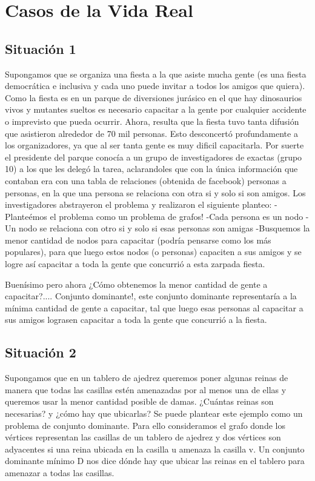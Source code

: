 \section{Casos de la Vida Real}

\subsection{Situación 1}
Supongamos que se organiza una fiesta a la que asiste mucha gente (es una fiesta democrática e inclusiva y cada uno puede invitar a todos los amigos que quiera). Como la fiesta es en un parque de diversiones jurásico en el que hay dinosaurios vivos y mutantes sueltos es necesario capacitar a la gente por cualquier accidente o imprevisto que pueda ocurrir. Ahora, resulta que la fiesta tuvo tanta difusión que asistieron alrededor de 70 mil personas. Esto desconcertó profundamente a los organizadores, ya que al ser tanta gente es muy dificil capacitarla. Por suerte el presidente del parque conocía a un grupo de investigadores de exactas (grupo 10) a los que les delegó la tarea, aclarandoles que con la única información que contaban era con una tabla de relaciones (obtenida de facebook) personas a personas, en la que una persona se relaciona con otra si y solo si son amigos.
Los investigadores abstrayeron el problema y realizaron el siguiente planteo:
-Planteémos el problema como un problema de grafos!
-Cada persona es un nodo
-Un nodo se relaciona con otro si y solo si esas personas son amigas
-Busquemos la menor cantidad de nodos para capacitar (podría pensarse como los más populares), para que luego estos nodos (o personas) capaciten a sus amigos y se logre así capacitar a toda la gente que concurrió a esta zarpada fiesta.

Buenísimo pero ahora ¿Cómo obtenemos la menor cantidad de gente a capacitar?.... Conjunto dominante!, este conjunto dominante representaría a la mínima cantidad de gente a capacitar, tal que luego esas personas al capacitar a sus amigos lograsen capacitar a toda la gente que concurrió a la fiesta.

\subsection{Situación 2}
Supongamos que en un tablero de ajedrez queremos poner algunas reinas de manera que todas las casillas estén amenazadas por al menos una de ellas y queremos usar la menor cantidad posible de damas. ¿Cuántas reinas son necesarias? y ¿cómo hay que ubicarlas? Se puede plantear este ejemplo como un problema de conjunto dominante. Para ello
consideramos el grafo donde los vértices representan las casillas de un tablero de ajedrez y dos vértices son adyacentes si una reina ubicada en la casilla u amenaza la casilla v. Un conjunto dominante mínimo D nos dice dónde hay que ubicar las reinas en el tablero para amenazar a todas las casillas. 

